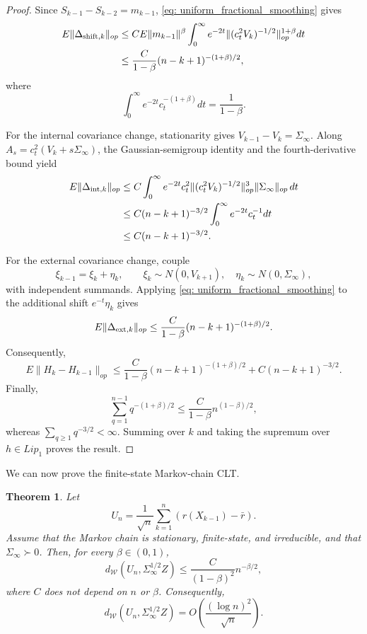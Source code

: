 \documentclass[11pt]{article}
\newtheorem{theorem}{Theorem}
\begin{document}
\begin{proof}
Since $S_{k-1}-S_{k-2}=m_{k-1}$, \eqref{eq: uniform_fractional_smoothing}
gives
\begin{align*}
E\|\Delta_{{\rm shift},k}\|_{op}
&\le C E\|m_{k-1}\|^\beta
\int_0^\infty e^{-2t}\|(c_t^2V_k)^{-1/2}\|_{op}^{1+\beta}dt\\
&\le \frac{C}{1-\beta}(n-k+1)^{-(1+\beta)/2},
\end{align*}
where
\[
    \int_0^\infty e^{-2t}c_t^{-(1+\beta)}dt=\frac1{1-\beta}.
\]

For the internal covariance change, stationarity gives
$V_{k-1}-V_k=\Sigma_\infty$. Along
$A_s=c_t^2(V_k+s\Sigma_\infty)$, the Gaussian-semigroup identity and the
fourth-derivative bound yield
\begin{align*}
E\|\Delta_{{\rm int},k}\|_{op}
&\le C\int_0^\infty e^{-2t}c_t^2
\|(c_t^2V_k)^{-1/2}\|_{op}^3\|\Sigma_\infty\|_{op}\,dt\\
&\le C(n-k+1)^{-3/2}\int_0^\infty e^{-2t}c_t^{-1}dt\\
&\le C(n-k+1)^{-3/2}.
\end{align*}

For the external covariance change, couple
\[
\xi_{k-1}=\xi_k+\eta_k,\qquad
\xi_k\sim N(0,V_{k+1}),\quad
\eta_k\sim N(0,\Sigma_\infty),
\]
with independent summands. Applying
\eqref{eq: uniform_fractional_smoothing} to the additional shift
$e^{-t}\eta_k$ gives
\[
E\|\Delta_{{\rm ext},k}\|_{op}
\le \frac{C}{1-\beta}(n-k+1)^{-(1+\beta)/2}.
\]
Consequently,
\[
E\|H_k-H_{k-1}\|_{op}
\le \frac{C}{1-\beta}(n-k+1)^{-(1+\beta)/2}
+C(n-k+1)^{-3/2}.
\]
Finally,
\[
\sum_{q=1}^{n-1}q^{-(1+\beta)/2}
\le \frac{C}{1-\beta}n^{(1-\beta)/2},
\]
whereas $\sum_{q\ge1}q^{-3/2}<\infty$. Summing over $k$ and taking the
supremum over $h\in Lip_1$ proves the result.
\end{proof}

We can now prove the finite-state Markov-chain CLT.

\begin{theorem}\label{thm: MC CLT}
Let
\[
U_n=\frac1{\sqrt n}\sum_{k=1}^n(r(X_{k-1})-\bar r).
\]
Assume that the Markov chain is stationary, finite-state, and irreducible,
and that $\Sigma_\infty\succ0$. Then, for every $\beta\in(0,1)$,
\[
d_{\mathcal W}(U_n,\Sigma_\infty^{1/2}Z)
\le \frac{C}{(1-\beta)^2}n^{-\beta/2},
\]
where $C$ does not depend on $n$ or $\beta$. Consequently,
\[
d_{\mathcal W}(U_n,\Sigma_\infty^{1/2}Z)
=O\left(\frac{(\log n)^2}{\sqrt n}\right).
\]
\end{theorem}
\end{document}
